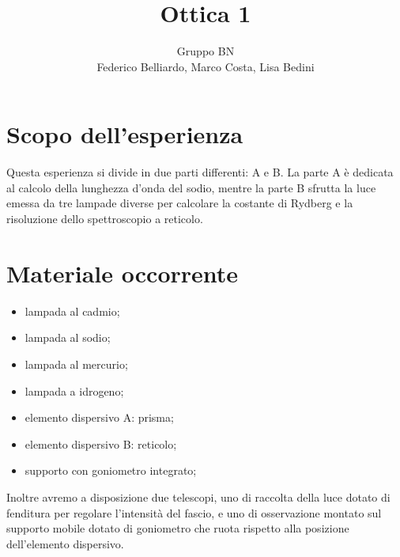 \documentclass[10pt,a4paper]{article}
\author{Gruppo BN \\ Federico Belliardo, Marco Costa, Lisa Bedini}
\title{Ottica 1}
\begin{document}
\maketitle
\section{Scopo dell'esperienza}
Questa esperienza si divide in due parti differenti: A e B.
La parte A è dedicata al calcolo della lunghezza d'onda del sodio, mentre la parte B sfrutta la luce emessa da tre lampade diverse per calcolare la costante di Rydberg e la risoluzione dello spettroscopio a reticolo.\\

\section{Materiale occorrente}
\begin{itemize}
\item lampada al cadmio;
\item lampada al sodio;
\item lampada al mercurio;
\item lampada a idrogeno;
\item elemento dispersivo A: prisma;
\item elemento dispersivo B: reticolo;
\item supporto con goniometro integrato;
\end{itemize}
Inoltre avremo a disposizione due telescopi, uno di raccolta della luce dotato di fenditura per regolare l'intensità del fascio, e uno di osservazione montato sul supporto mobile dotato di goniometro che ruota rispetto alla posizione dell'elemento dispersivo.\\
\end{document}
